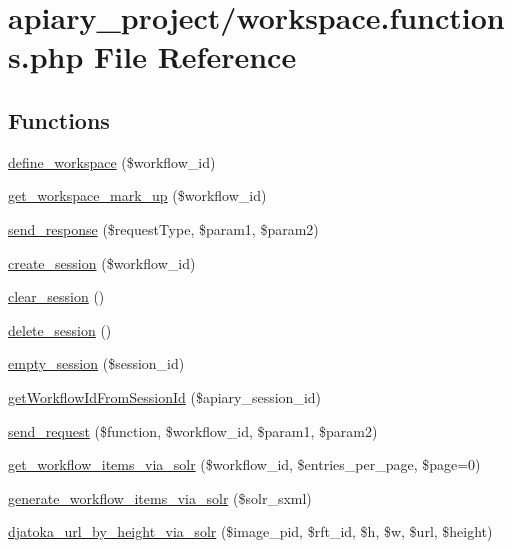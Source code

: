 \hypertarget{workspace_8functions_8php}{
\section{apiary_project/workspace.functions.php File Reference}
\label{workspace_8functions_8php}
}
\subsection*{Functions}
\begin{DoxyCompactItemize}
\item 
\hyperlink{workspace_8functions_8php_ac0cbb6a19004dceed34436c6ecbdb7f0}{define\_\-workspace} (\$workflow\_\-id)
\item 
\hyperlink{workspace_8functions_8php_a05c9eec0f69c46b0efede510a10c78c3}{get\_\-workspace\_\-mark\_\-up} (\$workflow\_\-id)
\item 
\hyperlink{workspace_8functions_8php_a74d87fc4a909ee407ee6c234183fae9d}{send\_\-response} (\$requestType, \$param1, \$param2)
\item 
\hyperlink{workspace_8functions_8php_a9f7db1db0cc821c4c64c17df1c48bb23}{create\_\-session} (\$workflow\_\-id)
\item 
\hyperlink{workspace_8functions_8php_ac5cf9b9706e3ebd83fd59a8003dea5cb}{clear\_\-session} ()
\item 
\hyperlink{workspace_8functions_8php_ae78eade784cc317e8ec88ff0952e492f}{delete\_\-session} ()
\item 
\hyperlink{workspace_8functions_8php_ae709f2164c1170596205abd99623482d}{empty\_\-session} (\$session\_\-id)
\item 
\hyperlink{workspace_8functions_8php_ae6e87527dc49b6e11a52142922d0614e}{getWorkflowIdFromSessionId} (\$apiary\_\-session\_\-id)
\item 
\hyperlink{workspace_8functions_8php_a966df1417fa7c1acd731bea57a21cdfb}{send\_\-request} (\$function, \$workflow\_\-id, \$param1, \$param2)
\item 
\hyperlink{workspace_8functions_8php_a228baa05e8acda612b60685412607100}{get\_\-workflow\_\-items\_\-via\_\-solr} (\$workflow\_\-id, \$entries\_\-per\_\-page, \$page=0)
\item 
\hyperlink{workspace_8functions_8php_a2fcfd59c37ffd7906e09b79ea7a1a55f}{generate\_\-workflow\_\-items\_\-via\_\-solr} (\$solr\_\-sxml)
\item 
\hyperlink{workspace_8functions_8php_a190c5a6633720455b59a3f8766a6b6f0}{djatoka\_\-url\_\-by\_\-height\_\-via\_\-solr} (\$image\_\-pid, \$rft\_\-id, \$h, \$w, \$url, \$height)

\end{DoxyCompactItemize}
